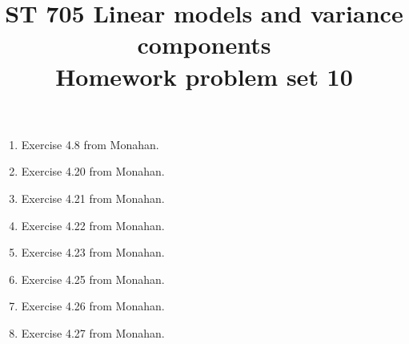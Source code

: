 \documentclass[11pt]{article}
\title{ST 705 Linear models and variance components \\ 
        Homework problem set 10}
\begin{document}
\maketitle

\begin{enumerate}


\item Exercise 4.8 from Monahan.

\item Exercise 4.20 from Monahan.

\item Exercise 4.21 from Monahan.

\item Exercise 4.22 from Monahan.

\item Exercise 4.23 from Monahan.

\item Exercise 4.25 from Monahan.

\item Exercise 4.26 from Monahan.

\item Exercise 4.27 from Monahan.




\end{enumerate}
\end{document}
